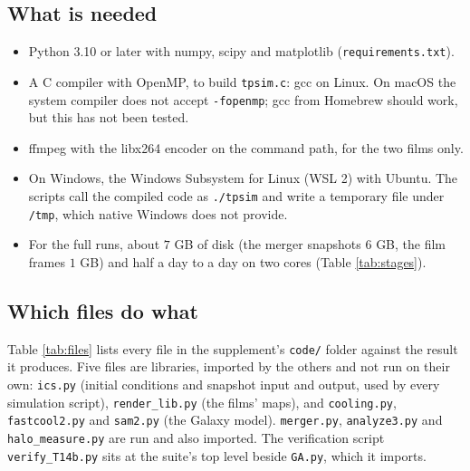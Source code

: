 \documentclass[11pt]{article}
\theoremstyle{definition}
\newcommand{\file}[1]{\texttt{#1}}
\begin{document}
\subsection{What is needed}

\begin{itemize}
\item Python 3.10 or later with numpy, scipy and matplotlib (\file{requirements.txt}).
\item A C compiler with OpenMP, to build \file{tpsim.c}: gcc on Linux. On macOS the system compiler does not accept \texttt{-fopenmp}; gcc from Homebrew should work, but this has not been tested.
\item ffmpeg with the libx264 encoder on the command path, for the two films only.
\item On Windows, the Windows Subsystem for Linux (WSL 2) with Ubuntu. The scripts call the compiled code as \texttt{./tpsim} and write a temporary file under \texttt{/tmp}, which native Windows does not provide.
\item For the full runs, about $7$ GB of disk (the merger snapshots $6$ GB, the film frames $1$ GB) and half a day to a day on two cores (Table \ref{tab:stages}).
\end{itemize}

\subsection{Which files do what}

Table \ref{tab:files} lists every file in the supplement's \file{code/} folder against the result it produces. Five files are libraries, imported by the others and not run on their own: \file{ics.py} (initial conditions and snapshot input and output, used by every simulation script), \file{render\_lib.py} (the films' maps), and \file{cooling.py}, \file{fastcool2.py} and \file{sam2.py} (the Galaxy model). \file{merger.py}, \file{analyze3.py} and \file{halo\_measure.py} are run and also imported. The verification script \file{verify\_T14b.py} sits at the suite's top level beside \file{GA.py}, which it imports.
\end{document}
